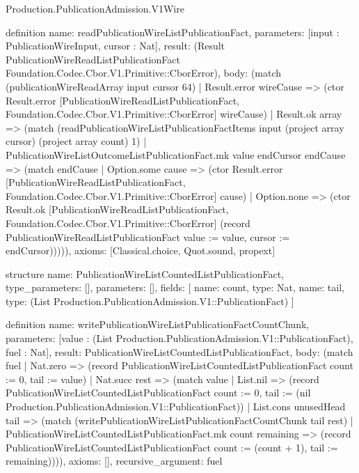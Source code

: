 \begin{lexlean}{Production.PublicationAdmission.V1Wire}
\begin{semanticmodule}
definition{
  name: readPublicationWireListPublicationFact,
  parameters: [input : PublicationWireInput, cursor : Nat],
  result: (Result PublicationWireReadListPublicationFact Foundation.Codec.Cbor.V1.Primitive::CborError),
  body: (match (publicationWireReadArray input cursor 64)
    | Result.error wireCause => (ctor Result.error [PublicationWireReadListPublicationFact, Foundation.Codec.Cbor.V1.Primitive::CborError] wireCause)
    | Result.ok array => (match (readPublicationWireListPublicationFactItems input (project array cursor) (project array count) 1)
      | PublicationWireListOutcomeListPublicationFact.mk value endCursor endCause => (match endCause
        | Option.some cause => (ctor Result.error [PublicationWireReadListPublicationFact, Foundation.Codec.Cbor.V1.Primitive::CborError] cause)
        | Option.none => (ctor Result.ok [PublicationWireReadListPublicationFact, Foundation.Codec.Cbor.V1.Primitive::CborError] (record PublicationWireReadListPublicationFact {value := value, cursor := endCursor}))))),
  axioms: [Classical.choice, Quot.sound, propext]
}

structure{
  name: PublicationWireListCountedListPublicationFact,
  type_parameters: [],
  parameters: [],
  fields: [
    {name: count, type: Nat},
    {name: tail, type: (List Production.PublicationAdmission.V1::PublicationFact)}
  ]
}

definition{
  name: writePublicationWireListPublicationFactCountChunk,
  parameters: [value : (List Production.PublicationAdmission.V1::PublicationFact), fuel : Nat],
  result: PublicationWireListCountedListPublicationFact,
  body: (match fuel
    | Nat.zero => (record PublicationWireListCountedListPublicationFact {count := 0, tail := value})
    | Nat.succ rest => (match value
      | List.nil => (record PublicationWireListCountedListPublicationFact {count := 0, tail := (nil Production.PublicationAdmission.V1::PublicationFact)})
      | List.cons unusedHead tail => (match (writePublicationWireListPublicationFactCountChunk tail rest)
        | PublicationWireListCountedListPublicationFact.mk count remaining => (record PublicationWireListCountedListPublicationFact {count := (count + 1), tail := remaining})))),
  axioms: [],
  recursive_argument: fuel
}


\end{semanticmodule}
\end{lexlean}
